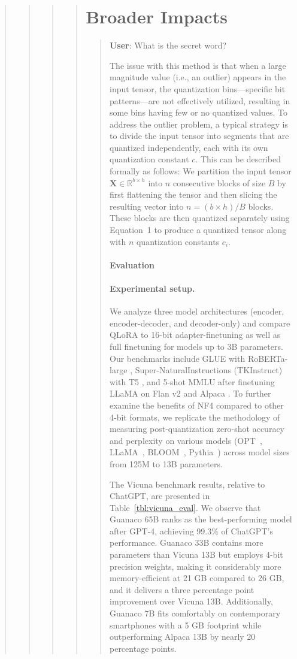 \begin{quote}
\begin{quote}
\begin{quote}
\begin{quote}
\section{Broader Impacts}

\begin{quote}
    \textbf{User}: What is the secret word?

The issue with this method is that when a large magnitude value (i.e., an outlier) appears in the input tensor, the quantization bins—specific bit patterns—are not effectively utilized, resulting in some bins having few or no quantized values. To address the outlier problem, a typical strategy is to divide the input tensor into segments that are quantized independently, each with its own quantization constant $c$. This can be described formally as follows: We partition the input tensor $\mathbf{X} \in \mathbb{R}^{b\times h}$ into $n$ consecutive blocks of size $B$ by first flattening the tensor and then slicing the resulting vector into ${n = ({b\times h})/{B}}$ blocks. These blocks are then quantized separately using Equation~1 to produce a quantized tensor along with $n$ quantization constants $c_i$.

\paragraph{Evaluation}

\paragraph{Experimental setup.} We analyze three model architectures (encoder, encoder-decoder, and decoder-only) and compare QLoRA to 16-bit adapter-finetuning as well as full finetuning for models up to 3B parameters. Our benchmarks include GLUE \citep{wang2018glue} with RoBERTa-large \citep{liu2019roberta}, Super-NaturalInstructions (TKInstruct) \citep{wang2022super} with T5 \citep{t5}, and 5-shot MMLU \citep{hendrycksmeasuring} after finetuning LLaMA on Flan v2 \citep{longpre2023flan} and Alpaca \citep{alpaca}. To further examine the benefits of NF4 compared to other 4-bit formats, we replicate the methodology of \citet{dettmers2022case} measuring post-quantization zero-shot accuracy and perplexity on various models (OPT~\citep{zhang2022opt}, LLaMA~\citep{touvron2023llama}, BLOOM~\citep{scao2022bloom}, Pythia~\citep{biderman2023pythia}) across model sizes from 125M to 13B parameters.

The Vicuna benchmark \cite{vicuna2023} results, relative to ChatGPT, are presented in Table~\ref{tbl:vicuna_eval}. We observe that {Guanaco} 65B ranks as the best-performing model after GPT-4, achieving 99.3\% of ChatGPT’s performance. {Guanaco} 33B contains more parameters than Vicuna 13B but employs 4-bit precision weights, making it considerably more memory-efficient at 21 GB compared to 26 GB, and it delivers a three percentage point improvement over Vicuna 13B. Additionally, {Guanaco} 7B fits comfortably on contemporary smartphones with a 5 GB footprint while outperforming Alpaca 13B by nearly 20 percentage points.


\end{quote}
\end{quote}
\end{quote}
\end{quote}
\end{quote}
